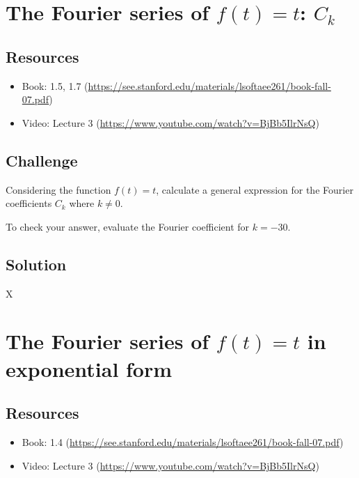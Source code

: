 \section{The Fourier series of $f(t)=t$: $C_k$}

\subsection*{Resources}
\begin{itemize}
    \item Book: 1.5, 1.7 (\url{https://see.stanford.edu/materials/lsoftaee261/book-fall-07.pdf})
    \item Video: Lecture 3 (\url{https://www.youtube.com/watch?v=BjBb5IlrNsQ})
\end{itemize}

\subsection*{Challenge}
Considering the function $f(t)=t$, calculate a general expression for the Fourier coefficients $C_k$ where $k \ne 0$.

To check your answer, evaluate the Fourier coefficient for $k=-30$.

\subsection*{Solution}
X


\timebox




\newpage

\section{The Fourier series of $f(t)=t$ in exponential form}
\label{sec:fstexpform}

\subsection*{Resources}
\begin{itemize}
    \item Book: 1.4 (\url{https://see.stanford.edu/materials/lsoftaee261/book-fall-07.pdf})
    \item Video: Lecture 3 (\url{https://www.youtube.com/watch?v=BjBb5IlrNsQ})
\end{itemize}

